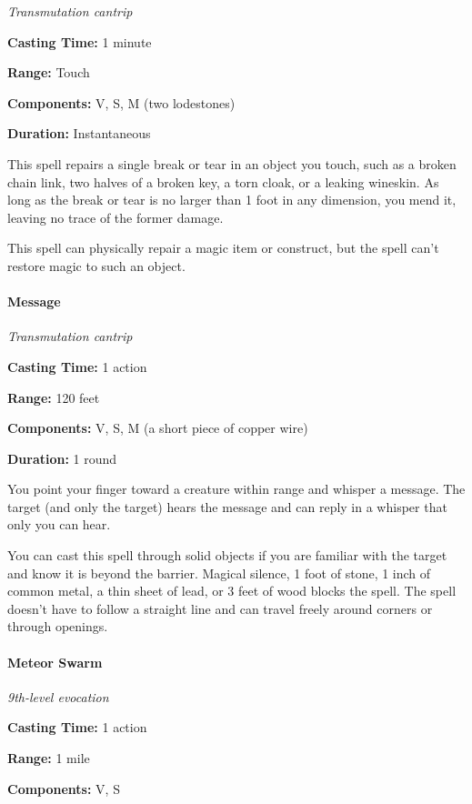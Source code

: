 \documentclass[
]{article}
\begin{document}
\emph{Transmutation cantrip}

\textbf{Casting Time:} 1 minute

\textbf{Range:} Touch

\textbf{Components:} V, S, M (two lodestones)

\textbf{Duration:} Instantaneous

This spell repairs a single break or tear in an object you touch, such
as a broken chain link, two halves of a broken key, a torn cloak, or a
leaking wineskin. As long as the break or tear is no larger than 1 foot
in any dimension, you mend it, leaving no trace of the former damage.

This spell can physically repair a magic item or construct, but the
spell can't restore magic to such an object.

\hypertarget{message}{%
\paragraph{Message}\label{message}}

\emph{Transmutation cantrip}

\textbf{Casting Time:} 1 action

\textbf{Range:} 120 feet

\textbf{Components:} V, S, M (a short piece of copper wire)

\textbf{Duration:} 1 round

You point your finger toward a creature within range and whisper a
message. The target (and only the target) hears the message and can
reply in a whisper that only you can hear.

You can cast this spell through solid objects if you are familiar with
the target and know it is beyond the barrier. Magical silence, 1 foot of
stone, 1 inch of common metal, a thin sheet of lead, or 3 feet of wood
blocks the spell. The spell doesn't have to follow a straight line and
can travel freely around corners or through openings.

\hypertarget{meteor-swarm}{%
\paragraph{Meteor Swarm}\label{meteor-swarm}}

\emph{9th-level evocation}

\textbf{Casting Time:} 1 action

\textbf{Range:} 1 mile

\textbf{Components:} V, S
\end{document}

